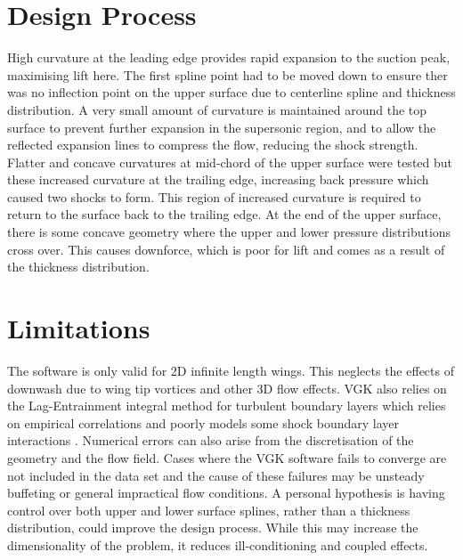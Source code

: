 \documentclass[11pt]{article}
\begin{document}
\section{Design Process}

High curvature at the leading edge provides rapid expansion to the suction peak, maximising lift here.
The first spline point had to be moved down to ensure ther was no inflection point on the upper surface due to centerline spline and thickness distribution.
A very small amount of curvature is maintained around the top surface to prevent further expansion in the supersonic region,
and to allow the reflected expansion lines to compress the flow, reducing the shock strength.
Flatter and concave curvatures at mid-chord of the upper surface were tested but these increased curvature at the trailing edge, increasing back pressure which caused two shocks to form.
This region of increased curvature is required to return to the surface back to the trailing edge.
At the end of the upper surface, there is some concave geometry where the upper and lower pressure distributions cross over.
This causes downforce, which is poor for lift and comes as a result of the thickness distribution.

\section{Limitations}

The software is only valid for 2D infinite length wings. This neglects the effects of downwash due to wing tip vortices and other 3D flow effects.
VGK also relies on the Lag-Entrainment integral method for turbulent boundary layers which relies on empirical correlations
and poorly models some shock boundary layer interactions \cite{lagentrainment}.
Numerical errors can also arise from the discretisation of the geometry and the flow field.
Cases where the VGK software fails to converge are not included in the data set and the cause of these failures may be unsteady buffeting or general impractical flow conditions.
A personal hypothesis is having control over both upper and lower surface splines, rather than a thickness distribution, could improve the design process.
While this may increase the dimensionality of the problem, it reduces ill-conditioning and coupled effects.

\end{document}
